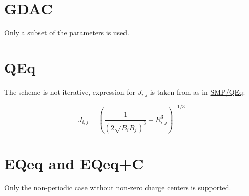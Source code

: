 \documentclass[oneside]{memoir}
\newcommand\ddfrac[2]{\frac{\displaystyle #1}{\displaystyle #2}}
\begin{document}
\section*{GDAC}
Only a subset of the parameters is used.

\section*{QEq}
The scheme is not iterative, expression for $J_{i,j}$ is taken from \cite{Louwen1998} as in \hyperref[sec:methods_smpqeq]{SMP/QEq}:

\begin{equation}
\label{eq:qeq_louwen}
J_{i, j} = \left(\ddfrac{1}{(2\sqrt{B_iB_j})^3} + R_{i,j}^3\right)^{-1/3}
\end{equation}

\section*{EQeq and EQeq+C}
Only the non-periodic case without non-zero charge centers is supported.

\printbibliography
\end{document}
